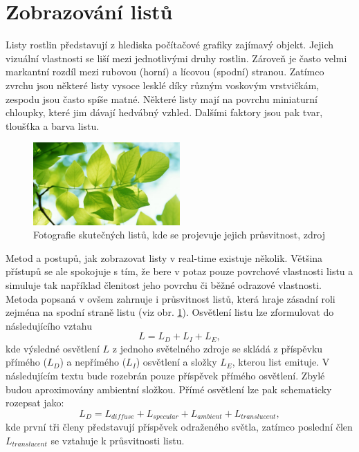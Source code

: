 \section{Zobrazování listů}
\label{sec-leafMethod}
Listy rostlin představují z hlediska počítačové grafiky zajímavý objekt. Jejich vizuální vlastnosti se liší mezi jednotlivými druhy rostlin. Zároveň je často velmi markantní rozdíl mezi rubovou (horní) a lícovou (spodní) stranou. Zatímco zvrchu jsou některé listy vysoce lesklé díky různým voskovým vrstvičkám, zespodu jsou často spíše matné. Některé listy mají na povrchu miniaturní chloupky, které jim dávají hedvábný vzhled. Dalšími faktory jsou pak tvar, tloušťka a barva listu. 
 \begin{figure}[here]
\begin{center}
\includegraphics[width=0.5\textwidth]{./figures/translucent_leaves.jpg}
\end{center}
\caption{ Fotografie skutečných listů, kde se projevuje jejich průsvitnost, zdroj \cite{TLW} \label{fig:translucentLeaves}
}

\end{figure}

Metod a postupů, jak zobrazovat listy v real-time existuje několik. Většina přístupů se ale spokojuje s tím, že bere v potaz pouze povrchové vlastnosti listu a simuluje tak například členitost jeho povrchu či běžné odrazové vlastnosti. Metoda popsaná v \cite{Habel_2007_RTT} ovšem zahrnuje i průsvitnost listů, která hraje zásadní roli zejména na spodní straně listu (viz obr. \ref{fig:translucentLeaves}). Osvětlení listu lze zformulovat do následujícího vztahu
\begin{equation}
L = L_D + L_I + L_E,
\end{equation}
kde výsledné osvětlení $L$ z jednoho světelného zdroje se skládá z příspěvku přímého ($L_D$) a nepřímého ($L_I$) osvětlení a složky $L_E$, kterou list emituje. 
V následujícím textu bude rozebrán pouze příspěvek přímého osvětlení. Zbylé budou aproximovány ambientní složkou. Přímé osvětlení lze pak schematicky rozepsat jako:
\begin{equation}
\label{eq:directLight}
L_D = L_{diffuse} + L_{specular}+ L_{ambient} + L_{translucent},
\end{equation}
kde první tři členy představují příspěvek odraženého světla, zatímco poslední člen $ L_{translucent}$ se vztahuje k průsvitnosti listu.

